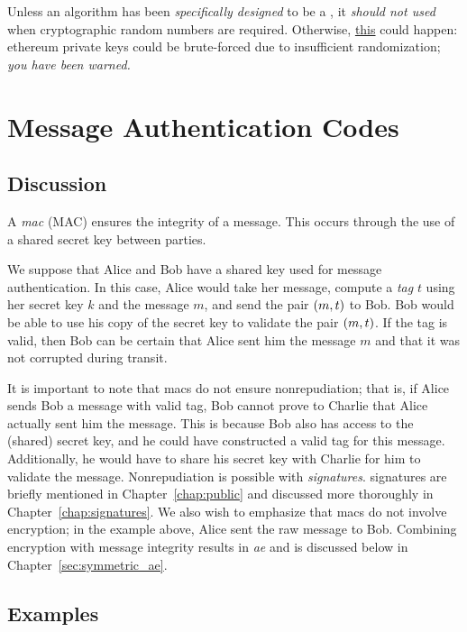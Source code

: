 Unless an algorithm has been \emph{specifically designed} to be a
,
it \emph{should not used} when cryptographic random numbers are required.
Otherwise, \href{https://github.com/johguse/profanity/issues/61}{this}
could happen:
\gls{ethereum} private keys could be brute-forced due to insufficient
randomization;
\emph{you have been warned.}





\section{Message Authentication Codes}
\label{sec:symmetric_mac}

\subsection{Discussion}

A \emph{\gls{mac}} (MAC) ensures the integrity
of a message.
This occurs through the use of a shared secret key between parties.

We suppose that Alice and Bob have a shared key used for
message authentication.
In this case, Alice would take her message,
compute a \emph{tag} $t$ using her secret key $k$ and the message $m$,
and send the pair $\left( m,t \right)$ to Bob.
Bob would be able to use his copy of the secret key to validate
the pair $\left( m,t \right)$.
If the tag is valid, then Bob can be certain that Alice sent him
the message $m$ and that it was not corrupted during transit.

It is important to note that \glspl{mac} do not ensure nonrepudiation;
that is, if Alice sends Bob a message with valid tag,
Bob cannot prove to Charlie that Alice actually sent him the message.
This is because Bob also has access to the (shared) secret key,
and he could have constructed a valid tag for this message.
Additionally, he would have to share his secret key with Charlie
for him to validate the message.
Nonrepudiation is possible with \emph{\glspl{signature}}.
\Glspl{signature} are briefly mentioned in Chapter~\ref{chap:public}
and discussed more thoroughly in Chapter~\ref{chap:signatures}.
We also wish to emphasize that \glspl{mac} do not involve encryption;
in the example above, Alice sent the raw message to Bob.
Combining encryption with message integrity results in
\emph{\gls{ae}} and is discussed
below in Chapter~\ref{sec:symmetric_ae}.

\subsection{Examples}

